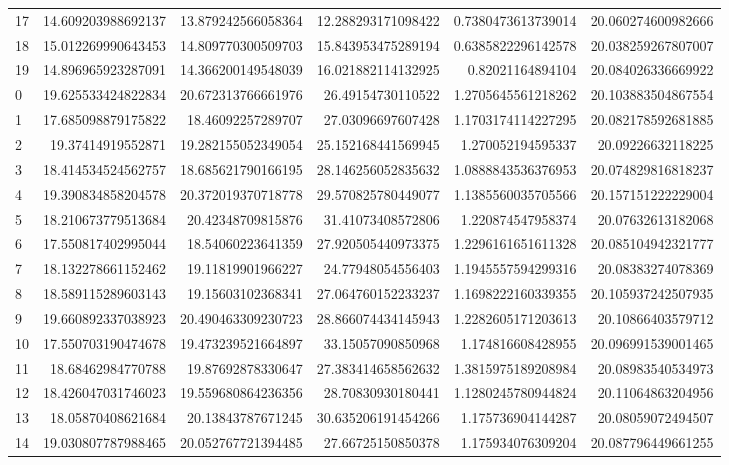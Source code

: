 \begin{tabular}{lrrrrr}
17 & 14.609203988692137 & 13.879242566058364 & 12.288293171098422 & 0.7380473613739014 & 20.060274600982666 \\
18 & 15.012269990643453 & 14.809770300509703 & 15.843953475289194 & 0.6385822296142578 & 20.038259267807007 \\
19 & 14.896965923287091 & 14.366200149548039 & 16.021882114132925 & 0.82021164894104 & 20.084026336669922 \\
0 & 19.625533424822834 & 20.672313766661976 & 26.49154730110522 & 1.2705645561218262 & 20.103883504867554 \\
1 & 17.685098879175822 & 18.46092257289707 & 27.03096697607428 & 1.1703174114227295 & 20.082178592681885 \\
2 & 19.37414919552871 & 19.282155052349054 & 25.152168441569945 & 1.270052194595337 & 20.09226632118225 \\
3 & 18.414534524562757 & 18.685621790166195 & 28.146256052835632 & 1.0888843536376953 & 20.074829816818237 \\
4 & 19.390834858204578 & 20.372019370718778 & 29.570825780449077 & 1.1385560035705566 & 20.157151222229004 \\
5 & 18.210673779513684 & 20.42348709815876 & 31.41073408572806 & 1.220874547958374 & 20.07632613182068 \\
6 & 17.550817402995044 & 18.54060223641359 & 27.920505440973375 & 1.2296161651611328 & 20.085104942321777 \\
7 & 18.132278661152462 & 19.11819901966227 & 24.77948054556403 & 1.1945557594299316 & 20.08383274078369 \\
8 & 18.589115289603143 & 19.15603102368341 & 27.064760152233237 & 1.1698222160339355 & 20.105937242507935 \\
9 & 19.660892337038923 & 20.490463309230723 & 28.866074434145943 & 1.2282605171203613 & 20.10866403579712 \\
10 & 17.550703190474678 & 19.473239521664897 & 33.15057090850968 & 1.174816608428955 & 20.096991539001465 \\
11 & 18.68462984770788 & 19.87692878330647 & 27.383414658562632 & 1.3815975189208984 & 20.08983540534973 \\
12 & 18.426047031746023 & 19.559680864236356 & 28.70830930180441 & 1.1280245780944824 & 20.11064863204956 \\
13 & 18.05870408621684 & 20.13843787671245 & 30.635206191454266 & 1.175736904144287 & 20.08059072494507 \\
14 & 19.030807787988465 & 20.052767721394485 & 27.66725150850378 & 1.175934076309204 & 20.087796449661255 \\

\end{tabular}
